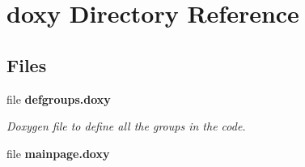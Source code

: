 \section{doxy Directory Reference}
\label{dir_0852b6145d5475d7a8e4df489fe46e4c}
\subsection*{Files}
\begin{DoxyCompactItemize}
\item 
file {\bf defgroups.\-doxy}
\begin{DoxyCompactList}\small\item\em Doxygen file to define all the groups in the code. \end{DoxyCompactList}\item 
file {\bfseries mainpage.\-doxy}
\end{DoxyCompactItemize}
